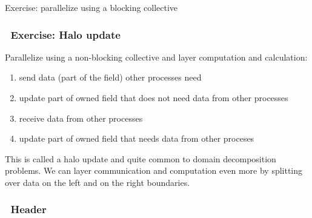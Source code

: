 Exercise: parallelize using a blocking collective

\subsubsection{~Exercise: Halo update}\label{exercise-halo-update}

Parallelize using a non-blocking collective and layer computation and
calculation:

\begin{enumerate}
\def\labelenumi{\arabic{enumi}.}
\itemsep1pt\parskip0pt
\item
  send data (part of the field) other processes need
\item
  update part of owned field that does not need data from other
  processes
\item
  receive data from other processes
\item
  update part of owned field that needs data from other proceses
\end{enumerate}

This is called a halo update and quite common to domain decomposition
problems. We can layer communication and computation even more by
splitting over data on the left and on the right boundaries.

\subsubsection{~Header}\label{header-1}

